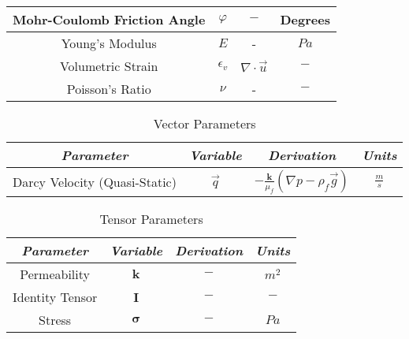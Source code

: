 \begin{table}[ht]
\begin{tabular}{c | c | c | c}
Mohr-Coulomb Friction Angle         & $\varphi$         & $-$                                 & Degrees \\ [0.5ex]\hline
Young's Modulus                     & $E$               & -                                   & $ Pa $ \\ [0.5ex]\hline
Volumetric Strain                   & $\epsilon_{v}$    & $ \nabla \cdot \vec{u}$             & $ - $ \\ [0.5ex]\hline    
Poisson's Ratio                     & $\nu$             & -                                   & $ - $ \\ [0.5ex]\hline   

 \end{tabular}
\end{table}

\begin{table}[ht]
 \caption{Vector Parameters}
 \centering
 \begin{tabular}{c | c | c | c}
  \hline\hline
  \textit{Parameter} & \textit{Variable}   & \textit{Derivation} & \textit{Units} \\ [0.75ex]\hline
Darcy Velocity (Quasi-Static) & $\vec{q}$  & $ -\frac{\bm{k}}{\mu_{f}} \left(\nabla p - \rho_{f} \vec{g} \right) $   & $\frac{m}{s}$ \\ [0.5ex]\hline 
\end{tabular}
\end{table}


\begin{table}[ht]
 \caption{Tensor Parameters}
 \centering
 \begin{tabular}{c | c | c | c}
  \hline\hline
  \textit{Parameter} & \textit{Variable}   & \textit{Derivation} & \textit{Units} \\ [0.75ex]\hline
Permeability         & $\bm{k}$            & $-$                 & $m^{2}$ \\ [0.5ex]\hline
Identity Tensor      & $\bm{I}$            & $-$                 & $-$ \\ [0.5ex]\hline 
Stress               & $\bm{\sigma}$       & $-$                 & $Pa$ \\ [0.5ex]\hline 
 \end{tabular}
\end{table}



